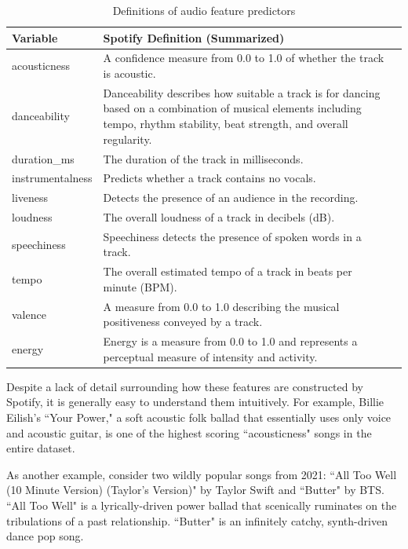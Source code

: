 \documentclass[12pt, twoside]{article}
\begin{document}
\begin{table}[H]
\centering
\caption{Definitions of audio feature predictors}
\label{tab:results}
\def\arraystretch{1.5}
\begin{tabular}{l  p{10cm}  p{3.4cm}} %
\hline
Variable & Spotify Definition (Summarized) \\ \hline
acousticness & A confidence measure from 0.0 to 1.0 of whether the track is acoustic. \\
danceability & Danceability describes how suitable a track is for dancing based on a combination of musical elements including tempo, rhythm stability, beat strength, and overall regularity. \\
duration\_ms & The duration of the track in milliseconds. \\
instrumentalness & Predicts whether a track contains no vocals. \\
liveness & Detects the presence of an audience in the recording. \\
loudness & The overall loudness of a track in decibels (dB). \\
speechiness & Speechiness detects the presence of spoken words in a track. \\
tempo & The overall estimated tempo of a track in beats per minute (BPM). \\
valence & A measure from 0.0 to 1.0 describing the musical positiveness conveyed by a track. \\
energy & Energy is a measure from 0.0 to 1.0 and represents a perceptual measure of intensity and activity.
\label{table:audio_features}
\end{tabular}
\end{table}
Despite a lack of detail surrounding how these features are constructed by Spotify, it is generally easy to understand them intuitively. For example, Billie Eilish's ``Your Power," a soft acoustic folk ballad that essentially uses only voice and acoustic guitar, is one of the highest scoring ``acousticness" songs in the entire dataset. 

As another example, consider two wildly popular songs from 2021: ``All Too Well (10 Minute Version) (Taylor's Version)" by Taylor Swift and ``Butter" by BTS. ``All Too Well" is a lyrically-driven power ballad that scenically ruminates on the tribulations of a past relationship. ``Butter" is an infinitely catchy, synth-driven dance pop song.
\end{document}
